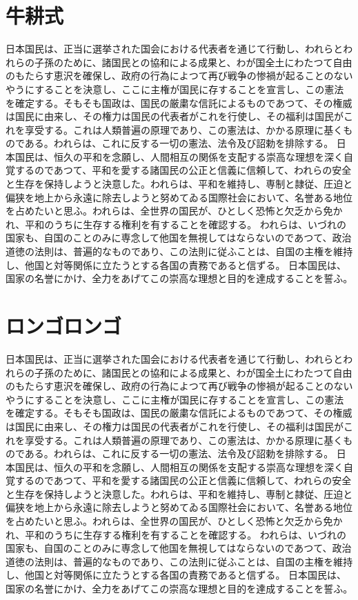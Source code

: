 \documentclass[dvipdfmx]{jsarticle}
\begin{document}
\clearpage

\section*{牛耕式}
\begin{boustrophedon}
日本国民は、正当に選挙された国会における代表者を通じて行動し、われらとわれらの子孫のために、諸国民との協和による成果と、わが国全土にわたつて自由のもたらす恵沢を確保し、政府の行為によつて再び戦争の惨禍が起ることのないやうにすることを決意し、ここに主権が国民に存することを宣言し、この憲法を確定する。そもそも国政は、国民の厳粛な信託によるものであつて、その権威は国民に由来し、その権力は国民の代表者がこれを行使し、その福利は国民がこれを享受する。これは人類普遍の原理であり、この憲法は、かかる原理に基くものである。われらは、これに反する一切の憲法、法令及び詔勅を排除する。
日本国民は、恒久の平和を念願し、人間相互の関係を支配する崇高な理想を深く自覚するのであつて、平和を愛する諸国民の公正と信義に信頼して、われらの安全と生存を保持しようと決意した。われらは、平和を維持し、専制と隷従、圧迫と偏狭を地上から永遠に除去しようと努めてゐる国際社会において、名誉ある地位を占めたいと思ふ。われらは、全世界の国民が、ひとしく恐怖と欠乏から免かれ、平和のうちに生存する権利を有することを確認する。
われらは、いづれの国家も、自国のことのみに専念して他国を無視してはならないのであつて、政治道徳の法則は、普遍的なものであり、この法則に従ふことは、自国の主権を維持し、他国と対等関係に立たうとする各国の責務であると信ずる。
日本国民は、国家の名誉にかけ、全力をあげてこの崇高な理想と目的を達成することを誓ふ。
\end{boustrophedon}

\section*{ロンゴロンゴ}
\begin{rongorongo}
日本国民は、正当に選挙された国会における代表者を通じて行動し、われらとわれらの子孫のために、諸国民との協和による成果と、わが国全土にわたつて自由のもたらす恵沢を確保し、政府の行為によつて再び戦争の惨禍が起ることのないやうにすることを決意し、ここに主権が国民に存することを宣言し、この憲法を確定する。そもそも国政は、国民の厳粛な信託によるものであつて、その権威は国民に由来し、その権力は国民の代表者がこれを行使し、その福利は国民がこれを享受する。これは人類普遍の原理であり、この憲法は、かかる原理に基くものである。われらは、これに反する一切の憲法、法令及び詔勅を排除する。
日本国民は、恒久の平和を念願し、人間相互の関係を支配する崇高な理想を深く自覚するのであつて、平和を愛する諸国民の公正と信義に信頼して、われらの安全と生存を保持しようと決意した。われらは、平和を維持し、専制と隷従、圧迫と偏狭を地上から永遠に除去しようと努めてゐる国際社会において、名誉ある地位を占めたいと思ふ。われらは、全世界の国民が、ひとしく恐怖と欠乏から免かれ、平和のうちに生存する権利を有することを確認する。
われらは、いづれの国家も、自国のことのみに専念して他国を無視してはならないのであつて、政治道徳の法則は、普遍的なものであり、この法則に従ふことは、自国の主権を維持し、他国と対等関係に立たうとする各国の責務であると信ずる。
日本国民は、国家の名誉にかけ、全力をあげてこの崇高な理想と目的を達成することを誓ふ。
\end{rongorongo}
\end{document}
